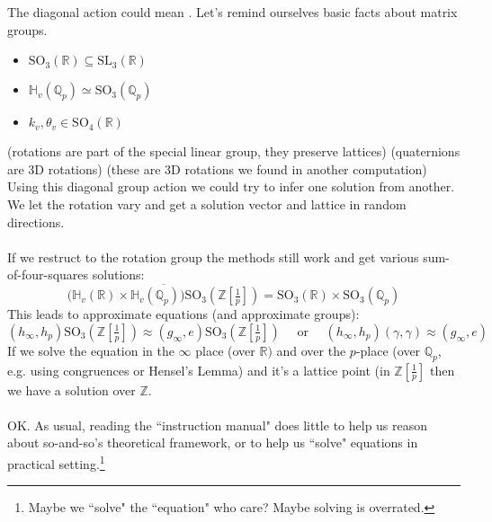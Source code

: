 \documentclass[12pt]{article}
\begin{document}
{The diagonal action could mean .  Let's remind ourselves basic facts about matrix groups.
\begin{itemize}
\item $\text{SO}_3(\mathbb{R}) \subseteq \text{SL}_3(\mathbb{R}) $ 
\item $\mathbb{H}_v(\mathbb{Q}_p) \simeq \text{SO}_3(\mathbb{Q}_p)$ 
\item $k_v, \theta_v \in \text{SO}_4(\mathbb{R})$ 
\end{itemize}
(rotations are part of the special linear group, they preserve lattices) (quaternions are 3D rotations) (these are 3D rotations we found  in another computation)  Using this diagonal group action we could try to infer one solution from another.  We let the rotation vary and get a solution vector and lattice in random directions. \\ \\
If we restruct to the rotation group the methods still work and get various sum-of-four-squares solutions:
$$\overline{ \big(\mathbb{H}_v(\mathbb{R}) \times \mathbb{H}_v(\mathbb{Q}_p)\big) \text{SO}_3(\mathbb{Z}[\tfrac{1}{p}]) }  = \text{SO}_3(\mathbb{R}) \times \text{SO}_3(\mathbb{Q}_p) $$
This leads to approximate equations (and approximate groups):
$$  (h_\infty, h_p) \text{SO}_3(\mathbb{Z}[\tfrac{1}{p}]) \approx (g_\infty, e)\text{SO}_3(\mathbb{Z}[\tfrac{1}{p}]) \quad\text{ or }\quad
(h_\infty, h_p) (\gamma, \gamma) \approx (g_\infty, e)$$
If we solve the equation in the $\infty$ place (over $\mathbb{R})$ and over the $p$-place 
(over $\mathbb{Q}_p$, e.g. using congruences or Hensel's Lemma) and it's a lattice point (in $\mathbb{Z}[\frac{1}{p}]$ then we have a solution over $\mathbb{Z}$. \\ \\
OK.  As usual, reading the ``instruction manual" does little to help us reason about so-and-so's theoretical framework, or to help us ``solve" equations in practical setting.\footnote{Maybe we ``solve" the ``equation" who care?  Maybe solving is overrated.}
}
\end{document}
